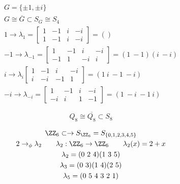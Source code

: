 \documentclass[class=scrartcl, crop=false]{standalone}
\begin{document}
\begin{example}
  \begin{gather*}
    G = \{\pm 1, \pm i\} \\
    G \cong \overline{G} \subset S_G \cong S_4 \\
    1 \to \lambda_1 = 
    \begin{bmatrix}
      1 & -1 & i & -i \\
      1 & -1 & i & -i
    \end{bmatrix}  = () 
    \\
    -1 \to \lambda_{-1} = 
        \begin{bmatrix}
      1 & -1 & i & -i \\
      -1 &  1 & -i &  i
    \end{bmatrix} = (1 \ -1) (i \ -i)
    \\
    i \to \lambda_{i}
        \begin{bmatrix}
      1 & -1 & i & -i \\
      i &  -i & -1 &  1
    \end{bmatrix}  = (1 \ i \ -1 \ -i)
    \\
    -i \to \lambda_{-i} = 
        \begin{bmatrix}
      1 & -1 & i & -i \\
      -i &   i &  1 &  -1
    \end{bmatrix}  = (1 \ -i \ -1 \ i)
  \end{gather*}
\end{example}

\begin{example}
  \[Q_8 \cong \overline{Q_8} \subset S_8\]
\end{example}

\begin{example}
  \begin{gather*}
    \ZZ_6 \subset \to  S_{\ZZ_6} = S_{\{0, 1, 2, 3, 4, 5\}} \\
    2 \to_{\phi} \lambda_2 \qquad \lambda_2: \ZZ_6 \to\ZZ_6 \qquad\lambda_2(x) = 2 + x \\
    \lambda_2 = (0 \ 2 \ 4)(1 \ 3 \ 5) \\
    \lambda_3 = (0 \ 3)(1 \ 4)(2 \ 5) \\
    \lambda_5 = (0 \ 5 \ 4 \ 3 \ 2 \ 1)
  \end{gather*}
\end{example}
\end{document}
